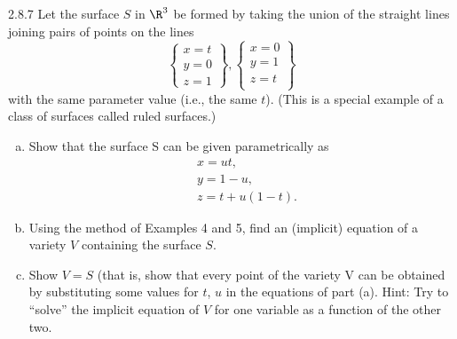 \documentclass[twoside]{article}
\begin{document}
\begin{ejercicio}{2.8.7}
Let the surface $S$ in $\R^3$ be formed by taking the union of the straight lines joining pairs
of points on the lines 
$$\left\lbrace
\begin{array}{c}
x = t\\
y = 0\\
z = 1
\end{array}
\right\rbrace,
\left\lbrace
\begin{array}{c}
x = 0\\
y = 1\\
z = t\\
\end{array}
\right\rbrace$$
with the same parameter value (i.e., the same $t$). (This is a special example of a class of
surfaces called ruled surfaces.)
\begin{enumerate}[a.]
\item Show that the surface S can be given parametrically as
\begin{align*}
&x = ut,\\
&y = 1 − u,\\
&z = t + u(1 − t).
\end{align*}
\item Using the method of Examples 4 and 5, find an (implicit) equation of a variety $V$
containing the surface $S$.
\item Show $V = S$ (that is, show that every point of the variety V can be obtained by
substituting some values for $t$, $u$ in the equations of part (a). Hint: Try to “solve” the
implicit equation of $V$ for one variable as a function of the other two.
\end{enumerate}
\end{ejercicio}
\begin{solucion}\

\end{solucion}

\newpage
\end{document}
